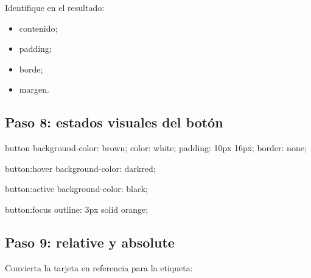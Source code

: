 \documentclass[11pt]{article}
\begin{document}
    Identifique en el resultado:

    \begin{itemize}
        \item contenido;
        \item padding;
        \item borde;
        \item margen.
    \end{itemize}

    \subsection{Paso 8: estados visuales del botón}

    \begin{csscodedark}
        button {
            background-color: brown;
            color: white;
            padding: 10px 16px;
            border: none;
        }

        button:hover {
            background-color: darkred;
        }

        button:active {
            background-color: black;
        }

        button:focus {
            outline: 3px solid orange;
        }
    \end{csscodedark}


    \subsection{Paso 9: relative y absolute}

    Convierta la tarjeta en referencia para la etiqueta:


\end{document}
